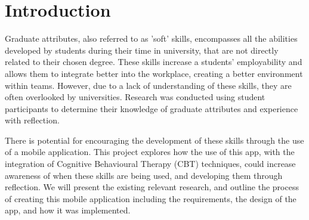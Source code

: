 \documentclass{l4proj}
\begin{document}
%
%
%
%
%
%
%
%
\chapter{Introduction}


Graduate attributes, also referred to as 'soft' skills, encompasses all the abilities developed by students during their time in university, that are not directly related to their chosen degree. These skills increase a students’ employability and allows them to integrate better into the workplace, creating a better environment within teams. However, due to a lack of understanding of these skills, they are often overlooked by universities. Research was conducted using student participants to determine their knowledge of graduate attributes and experience with reflection.

There is potential for encouraging the development of these skills through the use of a mobile application. This project explores how the use of this app, with the integration of Cognitive Behavioural Therapy (CBT) techniques, could increase awareness of when these skills are being used, and developing them through reflection. We will present the existing relevant research, and outline the process of creating this mobile application including the requirements, the design of the app, and how it was implemented.
\end{document}
